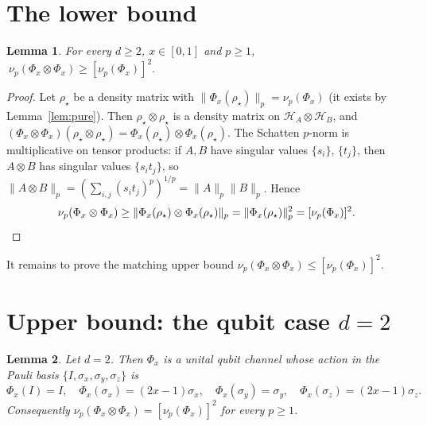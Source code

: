 \documentclass{amsart}
\newtheorem{lemma}{Lemma}
\theoremstyle{definition}
\newcommand{\HH}{\mathcal{H}}
\begin{document}
\section{The lower bound}
\label{sec:lower}

\begin{lemma}\label{lem:lower}
For every $d\ge2$, $x\in[0,1]$ and $p\ge1$,
$\ \nu_p(\Phi_x\otimes\Phi_x)\ge[\nu_p(\Phi_x)]^{2}.$
\end{lemma}

\begin{proof}
Let $\rho_\star$ be a density matrix with
$\|\Phi_x(\rho_\star)\|_p=\nu_p(\Phi_x)$ (it exists by Lemma~\ref{lem:pure}).
Then $\rho_\star\otimes\rho_\star$ is a density matrix on $\HH_A\otimes\HH_B$,
and $(\Phi_x\otimes\Phi_x)(\rho_\star\otimes\rho_\star)
=\Phi_x(\rho_\star)\otimes\Phi_x(\rho_\star)$. The Schatten $p$-norm is
multiplicative on tensor products: if $A,B$ have singular values $\{s_i\}$,
$\{t_j\}$, then $A\otimes B$ has singular values $\{s_it_j\}$, so
$\|A\otimes B\|_p=(\sum_{i,j}(s_it_j)^p)^{1/p}=\|A\|_p\|B\|_p$. Hence
\[
\nu_p(\Phi_x\otimes\Phi_x)\ge
\|\Phi_x(\rho_\star)\otimes\Phi_x(\rho_\star)\|_p
=\|\Phi_x(\rho_\star)\|_p^{2}=[\nu_p(\Phi_x)]^{2}. \qedhere
\]
\end{proof}

It remains to prove the matching upper bound
$\nu_p(\Phi_x\otimes\Phi_x)\le[\nu_p(\Phi_x)]^{2}$.

\section{Upper bound: the qubit case $d=2$}
\label{sec:qubit}

\begin{lemma}\label{lem:qubit}
Let $d=2$. Then $\Phi_x$ is a unital qubit channel whose action in the Pauli
basis $\{I,\sigma_x,\sigma_y,\sigma_z\}$ is
\begin{equation}\label{eq:ptm}
\Phi_x(I)=I,\quad
\Phi_x(\sigma_x)=(2x-1)\sigma_x,\quad
\Phi_x(\sigma_y)=\sigma_y,\quad
\Phi_x(\sigma_z)=(2x-1)\sigma_z .
\end{equation}
Consequently $\nu_p(\Phi_x\otimes\Phi_x)=[\nu_p(\Phi_x)]^{2}$ for every $p\ge1$.
\end{lemma}
\end{document}
